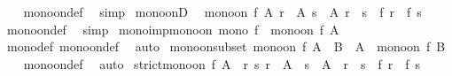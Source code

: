 \begin{isabellebody}
%
\isadelimproof
\ \ %
\endisadelimproof
%
\isatagproof
{}\isamarkupfalse%
\ mono{\isacharunderscore}{\kern0pt}on{\isacharunderscore}{\kern0pt}def\ \isamarkupfalse%
\ simp%
\endisatagproof
{\isafoldproof}%
%
\isadelimproof
\isanewline
%
\endisadelimproof
\isanewline
{}\isamarkupfalse%
\ mono{\isacharunderscore}{\kern0pt}onD{\isacharcolon}{\kern0pt}\isanewline
\ \ {\isachardoublequoteopen}{\isasymlbrakk}mono{\isacharunderscore}{\kern0pt}on\ f\ A{\isacharsemicolon}{\kern0pt}\ r\ {\isasymin}\ A{\isacharsemicolon}{\kern0pt}\ s\ {\isasymin}\ A{\isacharsemicolon}{\kern0pt}\ r\ {\isasymle}\ s{\isasymrbrakk}\ {\isasymLongrightarrow}\ f\ r\ {\isasymle}\ f\ s{\isachardoublequoteclose}\isanewline
%
\isadelimproof
\ \ %
\endisadelimproof
%
\isatagproof
{}\isamarkupfalse%
\ mono{\isacharunderscore}{\kern0pt}on{\isacharunderscore}{\kern0pt}def\ \isamarkupfalse%
\ simp%
\endisatagproof
{\isafoldproof}%
%
\isadelimproof
\isanewline
%
\endisadelimproof
\isanewline
{}\isamarkupfalse%
\ mono{\isacharunderscore}{\kern0pt}imp{\isacharunderscore}{\kern0pt}mono{\isacharunderscore}{\kern0pt}on{\isacharcolon}{\kern0pt}\ {\isachardoublequoteopen}mono\ f\ {\isasymLongrightarrow}\ mono{\isacharunderscore}{\kern0pt}on\ f\ A{\isachardoublequoteclose}\isanewline
%
\isadelimproof
\ \ %
\endisadelimproof
%
\isatagproof
{}\isamarkupfalse%
\ mono{\isacharunderscore}{\kern0pt}def\ mono{\isacharunderscore}{\kern0pt}on{\isacharunderscore}{\kern0pt}def\ \isamarkupfalse%
\ auto%
\endisatagproof
{\isafoldproof}%
%
\isadelimproof
\isanewline
%
\endisadelimproof
\isanewline
{}\isamarkupfalse%
\ mono{\isacharunderscore}{\kern0pt}on{\isacharunderscore}{\kern0pt}subset{\isacharcolon}{\kern0pt}\ {\isachardoublequoteopen}mono{\isacharunderscore}{\kern0pt}on\ f\ A\ {\isasymLongrightarrow}\ B\ {\isasymsubseteq}\ A\ {\isasymLongrightarrow}\ mono{\isacharunderscore}{\kern0pt}on\ f\ B{\isachardoublequoteclose}\isanewline
%
\isadelimproof
\ \ %
\endisadelimproof
%
\isatagproof
{}\isamarkupfalse%
\ mono{\isacharunderscore}{\kern0pt}on{\isacharunderscore}{\kern0pt}def\ \isamarkupfalse%
\ auto%
\endisatagproof
{\isafoldproof}%
%
\isadelimproof
\isanewline
%
\endisadelimproof
\isanewline
{}\isamarkupfalse%
\ {\isachardoublequoteopen}strict{\isacharunderscore}{\kern0pt}mono{\isacharunderscore}{\kern0pt}on\ f\ A\ {\isasymequiv}\ {\isasymforall}r\ s{\isachardot}{\kern0pt}\ r\ {\isasymin}\ A\ {\isasymand}\ s\ {\isasymin}\ A\ {\isasymand}\ r\ {\isacharless}{\kern0pt}\ s\ {\isasymlongrightarrow}\ f\ r\ {\isacharless}{\kern0pt}\ f\ s{\isachardoublequoteclose}\isanewline

\end{isabellebody}
